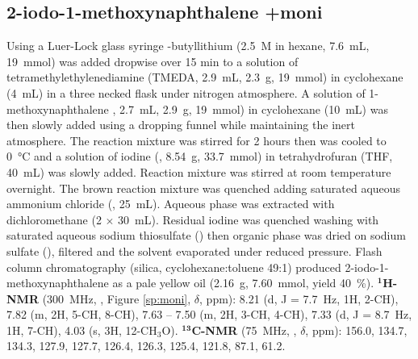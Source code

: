 \subsection{2-iodo-1-methoxy\-naphthalene \cmpd+{moni}}\label{sec:sperimentale-moni}
Using a Luer-Lock glass syringe \n-butyl\-lithium (2.5~M in hexane, 7.6~mL, 19~mmol) was added dropwise over 15 min to a solution of tetramethylethylenediamine (TMEDA, 2.9~mL, 2.3~g, 19~mmol) in cyclohexane (4~mL) in a three necked flask under nitrogen atmosphere. A solution of 1-methoxy\-naphthalene , 2.7~mL, 2.9~g, 19~mmol) %
in cyclohexane (10~mL) was then slowly added using a dropping funnel while maintaining the inert atmosphere.
The reaction mixture was stirred for 2 hours then was cooled to \SI{0}{\celsius} and a solution of iodine (, 8.54~g, 33.7~mmol) in tetrahydrofuran (THF, 40~mL) was slowly added. 
Reaction mixture was stirred at room temperature overnight. The brown reaction mixture was quenched adding saturated aqueous ammonium chloride (, 25~mL). 
Aqueous phase was extracted with di\-chloro\-methane (2 $\times$ 30~mL).
Residual iodine was quenched washing with saturated aqueous sodium thiosulfate () then organic phase was dried on sodium sulfate (), filtered and the solvent evaporated under reduced pressure. Flash column chromatography (silica, cyclohexane:toluene 49:1) produced 2-iodo-1-methoxy\-naphthalene  as a pale yellow oil (2.16~g, 7.60~mmol, yield 40~\%). $\mathbf{^{1}}$\textbf{H-NMR} (300~MHz, , 
Figure \ref{sp:moni}, $\delta$, ppm):  8.21 (d, J = 7.7~Hz, 1H, 2-CH), 7.82 (m,  2H, 5-CH, 8-CH), 7.63 – 7.50 (m, 2H, 3-CH, 4-CH), 7.33 (d, J = 8.7~Hz, 1H, 7-CH), 4.03 (s, 3H, 12-CH$_3$O). $^\mathbf{13}$\textbf{C-NMR} (75~MHz, , $\delta$, ppm):  156.0, 134.7, 134.3, 127.9, 127.7, 126.4, 126.3, 125.4, 121.8, 87.1, 61.2.


